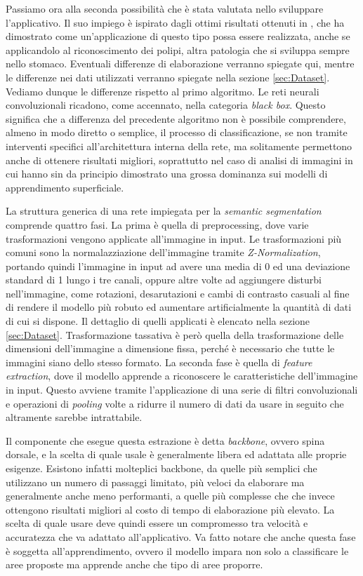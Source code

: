 Passiamo ora alla seconda possibilità che è stata valutata nello
sviluppare l'applicativo.
Il suo impiego è ispirato dagli ottimi risultati ottenuti in \cite{ilpaper},
che ha dimostrato come un'applicazione di questo tipo possa essere realizzata,
anche se applicandolo al riconoscimento dei polipi, altra patologia
che si sviluppa sempre nello stomaco.
Eventuali differenze di elaborazione verranno spiegate qui, mentre le
differenze nei dati utilizzati verranno spiegate nella sezione \ref{sec:Dataset}.
Vediamo dunque le differenze rispetto al primo algoritmo.
Le reti neurali convoluzionali ricadono, come accennato, nella categoria
{\it black box}.
Questo significa che a differenza del precedente algoritmo non è possibile
comprendere, almeno in modo diretto o semplice, il processo di classificazione,
se non tramite interventi specifici all'architettura interna della rete,
ma solitamente permettono anche di ottenere risultati migliori, soprattutto
nel caso di analisi di immagini in cui hanno sin da principio dimostrato
una grossa dominanza sui modelli di apprendimento superficiale.

La struttura generica di una rete impiegata per la {\it semantic segmentation}
comprende quattro fasi.
La prima è quella di  preprocessing, dove varie trasformazioni vengono applicate
all'immagine in input.
Le trasformazioni più comuni sono la normalazziazione dell'immagine
tramite {\it Z-Normalization}, portando quindi l'immagine in input
ad avere una media di 0 ed una deviazione standard di 1 lungo i tre canali,
oppure altre volte ad aggiungere disturbi nell'immagine, come rotazioni,
desarutazioni e cambi di contrasto casuali al fine di rendere il modello
più robuto ed aumentare artificialmente la quantità di dati di cui si
dispone.
Il dettaglio di quelli applicati è elencato nella sezione \ref{sec:Dataset}.
Trasformazione tassativa è però quella della trasformazione delle dimensioni
dell'immagine a dimensione fissa, perché è necessario che tutte le immagini
siano dello stesso formato.
La seconda fase è quella di {\it feature extraction}, dove il modello
apprende a riconoscere le caratteristiche dell'immagine in input.
Questo avviene tramite l'applicazione di una serie di filtri convoluzionali
e operazioni di {\it pooling} volte a ridurre il numero di dati da usare
in seguito che altramente sarebbe intrattabile.

Il componente che esegue questa estrazione è detta {\it backbone}, ovvero
spina dorsale, e la scelta di quale usale è generalmente libera
ed adattata alle proprie esigenze.
Esistono infatti molteplici backbone, da quelle più semplici che
utilizzano un numero di passaggi limitato, più veloci da elaborare
ma generalmente anche meno performanti, a quelle più complesse che
che invece ottengono risultati migliori al costo di tempo di elaborazione
più elevato.
La scelta di quale usare deve quindi essere un compromesso tra velocità
e accuratezza che va adattato all'applicativo.
Va fatto notare che anche questa fase è soggetta all'apprendimento, ovvero
il modello impara non solo a classificare le aree proposte ma apprende anche
che tipo di aree proporre.

